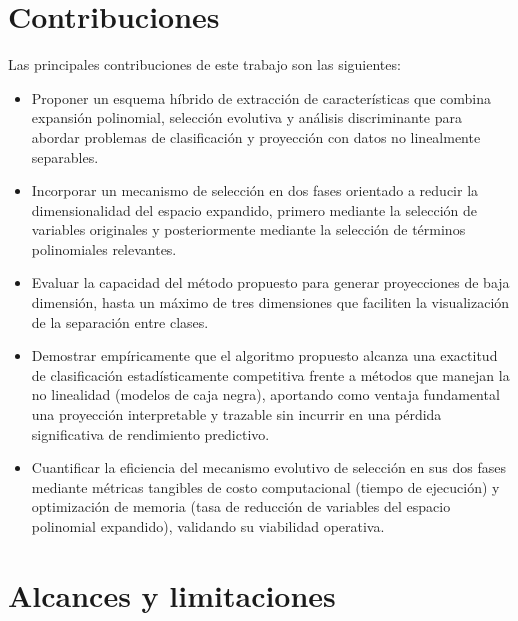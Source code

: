 \section{Contribuciones}
\label{sec:Contribuciones}

Las principales contribuciones de este trabajo son las siguientes:

\begin{itemize}
	
	\item Proponer un esquema híbrido de extracción de características que combina expansión polinomial, selección evolutiva y análisis discriminante para abordar problemas de
	clasificación y proyección con datos no linealmente separables.
	
	\item Incorporar un mecanismo de selección en dos fases orientado a reducir la dimensionalidad del espacio expandido, primero mediante la selección de variables originales y posteriormente mediante la selección de términos polinomiales relevantes.
	
	\item Evaluar la capacidad del método propuesto para generar proyecciones de baja dimensión, hasta un máximo de tres dimensiones que faciliten la visualización de la separación entre clases.
	
	\item Demostrar empíricamente que el algoritmo propuesto alcanza una exactitud de clasificación estadísticamente competitiva frente a métodos que manejan la no linealidad (modelos de caja negra), aportando como ventaja fundamental una proyección interpretable y trazable sin incurrir en una pérdida significativa de rendimiento predictivo.
	
	\item Cuantificar la eficiencia del mecanismo evolutivo de selección en sus dos fases mediante métricas tangibles de costo computacional (tiempo de ejecución) y optimización de memoria (tasa de reducción de variables del espacio polinomial expandido), validando su viabilidad operativa.
	
\end{itemize}

\section{Alcances y limitaciones}
\label{sec:Alcances-Limitaciones}


